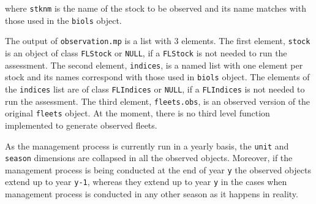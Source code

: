   \noindent where \texttt{stknm} is the name of the stock to be observed and its name matches with those used in the \texttt{biols} object.
  
	The output of \texttt{observation.mp} is a list with 3 elements. The first element, \texttt{stock} is an object 
	of class \texttt{FLStock} or \texttt{NULL}, if a \texttt{FLStock} is not needed to run the assessment.
	The second element, \texttt{indices}, is a named list with one element per stock and its names correspond with those used 
	in \texttt{biols} object. The elements of the \texttt{indices} list are   
	of class  \texttt{FLIndices} or \texttt{NULL}, if a \texttt{FLIndices} is not needed to run the assessment.    
	The third element, \texttt{fleets.obs}, is an observed version of the original \texttt{fleets} object.
	At the moment, there is no third level function implemented to generate observed fleets.


	As the management process is currently run in a yearly basis, the \texttt{unit} and \texttt{season}
	dimensions are collapsed in all the observed objects. Moreover, if the management process is being conducted at the end of year \texttt{y} the observed objects extend up to year \texttt{y-1}, 
  whereas they extend up to year \texttt{y} in the cases when management process is conducted in any other season as it happens in reality.
		
